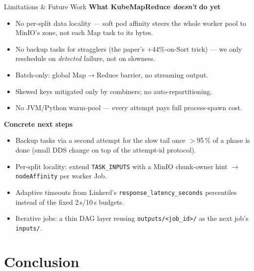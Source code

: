 \documentclass[11pt]{beamer}
\begin{document}
\begin{frame}{Limitations \& Future Work}
\scriptsize
\textbf{What KubeMapReduce \emph{doesn't} do yet}
\begin{itemize}
  \item \alert{No per-split data locality} --- soft pod affinity steers the whole
        worker pool to MinIO's zone, not each Map task to its bytes.
  \item \alert{No backup tasks for stragglers} (the paper's $+44\%$-on-Sort trick) ---
        we only reschedule on \emph{detected} failure, not on slowness.
  \item \alert{Batch-only}: global Map$\to$Reduce barrier, no streaming output.
  \item \alert{Skewed keys} mitigated only by combiners; no auto-repartitioning.
  \item No JVM/Python \alert{warm-pool} --- every attempt pays full process-spawn cost.
\end{itemize}

\vspace{0.3em}
\textbf{Concrete next steps}
\begin{itemize}
  \item \alert{Backup tasks} via a second attempt for the slow tail once $>$95\,\% of a
        phase is done (small DDS change on top of the attempt-id protocol).
  \item \alert{Per-split locality}: extend \texttt{TASK\_INPUTS} with a MinIO chunk-owner
        hint $\to$ \texttt{nodeAffinity} per worker Job.
  \item \alert{Adaptive timeouts} from Linkerd's \texttt{response\_latency\_seconds}
        percentiles instead of the fixed 2\,s/10\,s budgets.
  \item \alert{Iterative jobs}: a thin DAG layer reusing \texttt{outputs/<job\_id>/}
        as the next job's \texttt{inputs/}.
\end{itemize}
\end{frame}

\section*{Conclusion}
\end{document}
